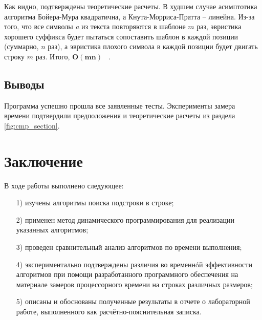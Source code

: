 \documentclass[a4paper,12pt]{article}
\begin{document}
Как видно, подтверждены теоретические расчеты. В худшем случае
асимптотика алгоритма Бойера-Мура квадратична, а Кнута-Морриса-Пратта -- линейна.
Из-за того, что все символы \textit{a} из текста повторяются в шаблоне $m$ раз, эвристика хорошего суффикса будет пытаться сопоставить шаблон в каждой позиции (суммарно, $n$ раз), а эвристика плохого символа в каждой позиции будет двигать строку $m$ раз. Итого, $\mathbf{O(mn)}$ ~\cite{search}.

\subsection*{Выводы}

Программа успешно прошла все заявленные тесты. Эксперименты замера времени подтвердили предположения и
теоретические расчеты из раздела \ref{fig:cmp_section}.

\section*{Заключение}

В ходе работы выполнено следующее:

\begin{enumerate} 
	\item[1)] изучены алгоритмы поиска подстроки в строке;
	\item[2)] применен метод динамического программирования для  
	реализации указанных алгоритмов;
	\item[3)] проведен сравнительный анализ алгоритмов по времени выполнения;
	\item[4)] экспериментально подтверждены различия во временнóй эффективности алгоритмов 
	при помощи разработанного программного обеспечения на материале замеров процессорного 
	времени на строках различных размеров;
	\item[5)] описаны и обоснованы полученные результаты в отчете о лабораторной 
	работе, выполненного как расчётно-пояснительная записка. 
\end{enumerate}
\end{document}
